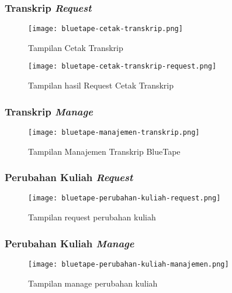 	\subsubsection{Transkrip \textit{Request}}
	\begin{figure}[H]
		\centering  
		\texttt{[image: bluetape-cetak-transkrip.png]}  
		\caption[Tampilan Cetak Transkrip]{Tampilan Cetak Transkrip} 
		\label{fig:bluetape-cetak-transkrip} 
	\end{figure}

	\begin{figure}[H]
		\centering  
		\texttt{[image: bluetape-cetak-transkrip-request.png]}  
		\caption[Tampilan hasil Request Cetak Transkrip]{Tampilan hasil Request Cetak Transkrip} 
		\label{fig:bluetape-cetak-transkrip-request} 
	\end{figure}
	
	\subsubsection{Transkrip \textit{Manage}}
	\begin{figure}[H]
		\centering  
		\texttt{[image: bluetape-manajemen-transkrip.png]}  
		\caption[Tampilan Manajemen Transkrip BlueTape]{Tampilan Manajemen Transkrip BlueTape} 
		\label{fig:bluetape-manajemen-transkrip} 
	\end{figure}
	
	\subsubsection{Perubahan Kuliah \textit{Request}}
	\begin{figure}[H]
		\centering  
		\texttt{[image: bluetape-perubahan-kuliah-request.png]}  
		\caption[Tampilan request perubahan kuliah]{Tampilan request perubahan kuliah} 
		\label{fig:bluetape-perubahan-kuliah-request} 
	\end{figure}
	
	\subsubsection{Perubahan Kuliah \textit{Manage}}
	\begin{figure}[H]
		\centering  
		\texttt{[image: bluetape-perubahan-kuliah-manajemen.png]}  
		\caption[Tampilan manage perubahan kuliah]{Tampilan manage perubahan kuliah} 
		\label{fig:bluetape-perubahan-kuliah-manajemen} 
	\end{figure}
	
